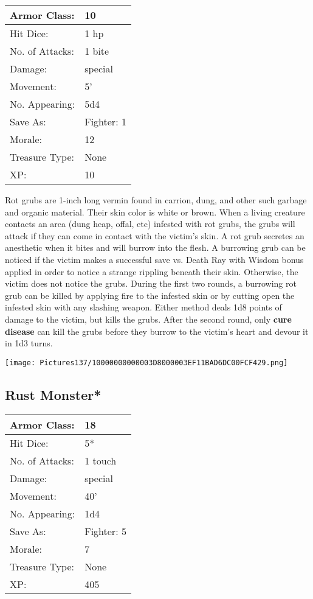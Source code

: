 \documentclass[a4paper,twoside,openany,10pt]{book}
\begin{document}
\begin{multicols}{2}
\begin{tabularx}{0.50\textwidth}{@{}lX@{}}
Armor Class: & 10 \\\hline
Hit Dice: & 1 hp \\\hline
No. of Attacks: & 1 bite \\\hline
Damage: & special \\\hline
Movement: & 5' \\\hline
No. Appearing: & 5d4 \\\hline
Save As: & Fighter: 1 \\\hline
Morale: & 12 \\\hline
Treasure Type: & None \\\hline
XP: & 10 \\\hline
\end{tabularx}\medskip

Rot grubs are 1-inch long vermin found in carrion, dung, and other such garbage and organic material. Their skin color is white or brown. When a living creature contacts an area (dung heap, offal, etc) infested with rot grubs, the grubs will attack if they can come in contact with the victim's skin. A rot grub secretes an anesthetic when it bites and will burrow into the flesh. A burrowing grub can be noticed if the victim makes a successful save vs. Death Ray with Wisdom bonus applied in order to notice a strange rippling beneath their skin. Otherwise, the victim does not notice the grubs. During the first two rounds, a burrowing rot grub can be killed by applying fire to the infested skin or by cutting open the infested skin with any slashing weapon. Either method deals 1d8 points of damage to the victim, but kills the grubs. After the second round, only \textbf{cure disease} can kill the grubs before they burrow to the victim's heart and devour it in 1d3 turns.

\begin{center} \texttt{[image: Pictures137/10000000000003D8000003EF11BAD6DC00FCF429.png]} \end{center}


\subsection*{Rust Monster*}\label{rust-monster}

\begin{tabularx}{0.50\textwidth}{@{}lX@{}}
Armor Class: & 18 \\\hline
Hit Dice: & 5* \\\hline
No. of Attacks: & 1 touch \\\hline
Damage: & special \\\hline
Movement: & 40' \\\hline
No. Appearing: & 1d4 \\\hline
Save As: & Fighter: 5 \\\hline
Morale: & 7 \\\hline
Treasure Type: & None \\\hline
XP: & 405 \\\hline
\end{tabularx}\medskip


\end{multicols}
\end{document}
